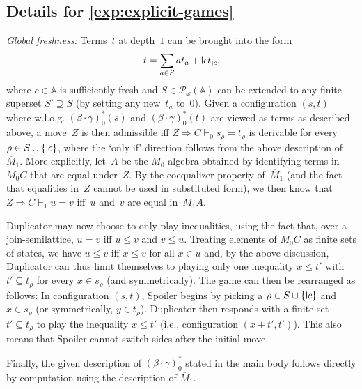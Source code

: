 \documentclass[11pt,a4paper]{amsart}
\newcommand{\centails}{\Rightarrow}
\newcommand{\Names}{\mathbb{A}}
\newcommand{\pow}{\mathcal{P}}
\newcommand{\powf}{\pow_{\omega}}
\newcommand{\mbar}{\overline{M}_1}
\theoremstyle{plain}
\newcommand{\midmid}{\hspace{0.2ex}{\rule[-0.1ex]{0.6pt}{1.65ex}}\hspace{0.2ex}}
\newcommand{\scriptmidmid}{\hspace{0.2ex}{\rule[-0.1ex]{0.6pt}{1.1ex}}\hspace{0.2ex}}
\newcommand{\newletter}[1]{{\midmid}#1}
\newcommand{\scriptnew}[1]{{\scriptmidmid}#1}
\numberwithin{equation}{section}
\newcommand{\+}[1]{\mathcal{#1}\xspace}
\theoremstyle{definition}
\begin{document}
\subsection*{Details for \cref{exp:explicit-games}}

\noindent\emph{Global freshness:}
Terms~$t$ at depth~$1$ can be brought into the form
\begin{equation*}
  t = \sum_{a \in S} at_a + \newletter{c}t_{\scriptnew{c}},
\end{equation*}
where $c \in \Names$ is sufficiently fresh and $S \in \powf(\Names)$ can be extended to any finite superset $S' \supseteq S$ (by setting any new~$t_a$ to~$0$).
Given a configuration $(s,t)$ where w.l.o.g. $(\beta\cdot\gamma)^*_0(s)$ and $(\beta\cdot\gamma)^*_0(t)$ are viewed as terms as described above, a move~$Z$ is then admissible iff $Z \centails C \vdash_0 s_\rho = t_\rho$ is derivable for every $\rho \in S \cup \{\newletter{c}\}$, where the `only if' direction follows from the above description of $\mbar$.
More explicitly, let~$A$ be the $M_0$-algebra obtained by identifying terms in~$M_0C$ that are equal under~$Z$.
By the coequalizer property of~$\mbar$ (and the fact that equalities in~$Z$ cannot be used in substituted form), we then know that $Z \centails C \vdash_1 u = v$ iff~$u$ and~$v$ are equal in~$\mbar A$.

Duplicator may now choose to only play inequalities, using the fact that, over a join-semilattice, $u = v$ iff $u \le v$ and $v \le u$.
Treating elements of $M_0C$ as finite sets of states, we have $u \le v$ iff $x \le v$ for all $x \in u$ and, by the above discussion, Duplicator can thus limit themselves to playing only one inequality $x \le t'$ with $t' \subseteq t_\rho$ for every $x \in s_\rho$ (and symmetrically).
The game can then be rearranged as follows:
In configuration $(s,t)$, Spoiler begins by picking a $\rho \in S \cup \{\newletter{c}\}$ and $x \in s_\rho$ (or symmetrically, $y \in t_\rho$).
Duplicator then responds with a finite set $t' \subseteq t_\rho$ to play the inequality $x \le t'$ (i.e., configuration $(x + t',t')$).
This also means that Spoiler cannot switch sides after the initial move.

Finally, the given description of $(\beta \cdot \gamma)^*_0$ stated in the main body follows directly by computation using the description of $\mbar$.
\end{document}
